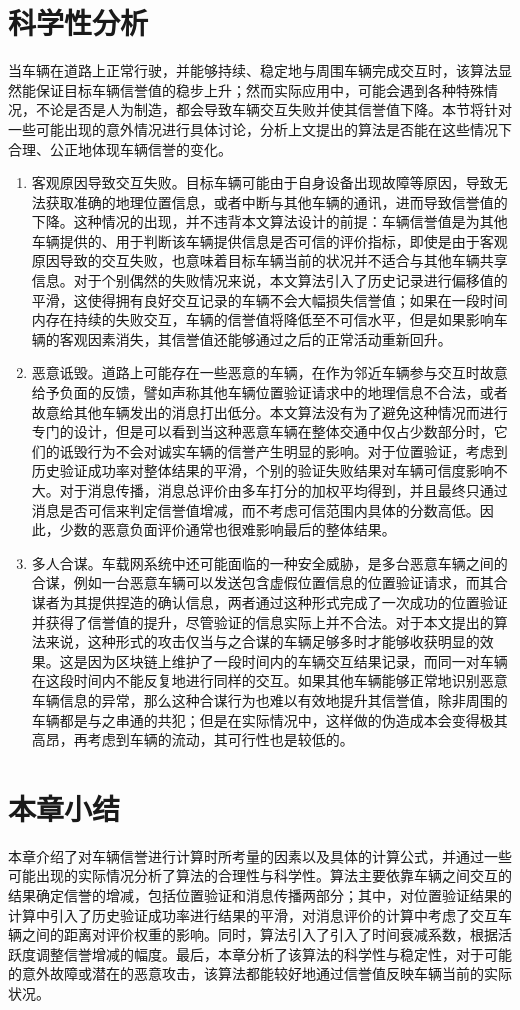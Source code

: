 \section{科学性分析}

当车辆在道路上正常行驶，并能够持续、稳定地与周围车辆完成交互时，该算法显然能保证目标车辆信誉值的稳步上升；然而实际应用中，可能会遇到各种特殊情况，不论是否是人为制造，都会导致车辆交互失败并使其信誉值下降。本节将针对一些可能出现的意外情况进行具体讨论，分析上文提出的算法是否能在这些情况下合理、公正地体现车辆信誉的变化。

\begin{enumerate}
    \item 客观原因导致交互失败。目标车辆可能由于自身设备出现故障等原因，导致无法获取准确的地理位置信息，或者中断与其他车辆的通讯，进而导致信誉值的下降。这种情况的出现，并不违背本文算法设计的前提：车辆信誉值是为其他车辆提供的、用于判断该车辆提供信息是否可信的评价指标，即使是由于客观原因导致的交互失败，也意味着目标车辆当前的状况并不适合与其他车辆共享信息。对于个别偶然的失败情况来说，本文算法引入了历史记录进行偏移值的平滑，这使得拥有良好交互记录的车辆不会大幅损失信誉值；如果在一段时间内存在持续的失败交互，车辆的信誉值将降低至不可信水平，但是如果影响车辆的客观因素消失，其信誉值还能够通过之后的正常活动重新回升。
    \item 恶意诋毁。道路上可能存在一些恶意的车辆，在作为邻近车辆参与交互时故意给予负面的反馈，譬如声称其他车辆位置验证请求中的地理信息不合法，或者故意给其他车辆发出的消息打出低分。本文算法没有为了避免这种情况而进行专门的设计，但是可以看到当这种恶意车辆在整体交通中仅占少数部分时，它们的诋毁行为不会对诚实车辆的信誉产生明显的影响。对于位置验证，考虑到历史验证成功率对整体结果的平滑，个别的验证失败结果对车辆可信度影响不大。对于消息传播，消息总评价由多车打分的加权平均得到，并且最终只通过消息是否可信来判定信誉值增减，而不考虑可信范围内具体的分数高低。因此，少数的恶意负面评价通常也很难影响最后的整体结果。
    \item 多人合谋。车载网系统中还可能面临的一种安全威胁，是多台恶意车辆之间的合谋，例如一台恶意车辆可以发送包含虚假位置信息的位置验证请求，而其合谋者为其提供捏造的确认信息，两者通过这种形式完成了一次成功的位置验证并获得了信誉值的提升，尽管验证的信息实际上并不合法。对于本文提出的算法来说，这种形式的攻击仅当与之合谋的车辆足够多时才能够收获明显的效果。这是因为区块链上维护了一段时间内的车辆交互结果记录，而同一对车辆在这段时间内不能反复地进行同样的交互。如果其他车辆能够正常地识别恶意车辆信息的异常，那么这种合谋行为也难以有效地提升其信誉值，除非周围的车辆都是与之串通的共犯；但是在实际情况中，这样做的伪造成本会变得极其高昂，再考虑到车辆的流动，其可行性也是较低的。
\end{enumerate}

\section{本章小结}
本章介绍了对车辆信誉进行计算时所考量的因素以及具体的计算公式，并通过一些可能出现的实际情况分析了算法的合理性与科学性。算法主要依靠车辆之间交互的结果确定信誉的增减，包括位置验证和消息传播两部分；其中，对位置验证结果的计算中引入了历史验证成功率进行结果的平滑，对消息评价的计算中考虑了交互车辆之间的距离对评价权重的影响。同时，算法引入了引入了时间衰减系数，根据活跃度调整信誉增减的幅度。最后，本章分析了该算法的科学性与稳定性，对于可能的意外故障或潜在的恶意攻击，该算法都能较好地通过信誉值反映车辆当前的实际状况。